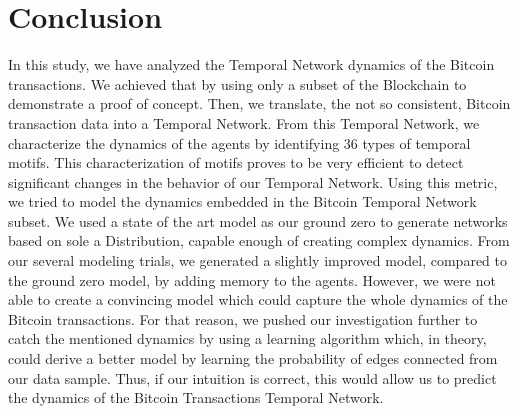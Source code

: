 
\section{Conclusion}
\label{sec:conclusion}

In this study, we have analyzed the Temporal Network dynamics of the Bitcoin transactions. We achieved that by using only a subset of the Blockchain to demonstrate a proof of concept. Then, we translate, the not so consistent, Bitcoin transaction data into a Temporal Network. From this Temporal Network, we characterize the dynamics of the agents by identifying 36 types of temporal motifs. This characterization of motifs proves to be very efficient to detect significant changes in the behavior of our Temporal Network. Using this metric, we tried to model the dynamics embedded in the Bitcoin Temporal Network subset. We used a state of the art model as our ground zero to generate networks based on sole a Distribution, capable enough of creating complex dynamics. From our several modeling trials, we generated a slightly improved model, compared to the ground zero model, by adding memory to the agents. However, we were not able to create a convincing model which could capture the whole dynamics of the Bitcoin transactions. For that reason, we pushed our investigation further to catch the mentioned dynamics by using a learning algorithm which, in theory, could derive a better model by learning the probability of edges connected from our data sample. Thus, if our intuition is correct, this would allow us to predict the dynamics of the Bitcoin Transactions Temporal Network. 
